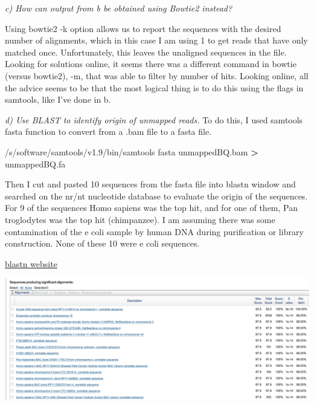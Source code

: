 \documentclass[12pt,]{article}
\newenvironment{Shaded}{\begin{snugshade}}{\end{snugshade}}
\newcommand{\CommentTok}[1]{\textcolor[rgb]{0.56,0.35,0.01}{\textit{#1}}}
\newcommand{\VariableTok}[1]{\textcolor[rgb]{0.00,0.00,0.00}{#1}}
\newcommand{\OperatorTok}[1]{\textcolor[rgb]{0.81,0.36,0.00}{\textbf{#1}}}
\newcommand{\BuiltInTok}[1]{#1}
\newcommand{\ExtensionTok}[1]{#1}
\newcommand{\NormalTok}[1]{#1}
\begin{document}
\emph{c) How can output from b be obtained using Bowtie2 instead?}

Using bowtie2 -k option allows us to report the sequences with the
desired number of alignments, which in this case I am using 1 to get
reads that have only matched once. Unfortunately, this leaves the
unaligned sequences in the file. Looking for solutions online, it seems
there was a different command in bowtie (versus bowtie2), -m, that was
able to filter by number of hits. Looking online, all the advice seems
to be that the most logical thing is to do this using the flags in
samtools, like I've done in b.

\begin{Shaded}
\end{Shaded}

\emph{d) Use BLAST to identify origin of unmapped reads.} To do this, I
used samtools fasta function to convert from a .bam file to a fasta
file.

\begin{Shaded}
\begin{Highlighting}[]
\ExtensionTok{/s/software/samtools/v1.9/bin/samtools}\NormalTok{ fasta unmappedBQ.bam }\OperatorTok{>}\NormalTok{ unmappedBQ.fa}
\end{Highlighting}
\end{Shaded}

Then I cut and pasted 10 sequences from the fasta file into blastn
window and searched on the nr/nt nucleotide database to evaluate the
origin of the sequences. For 9 of the sequences Homo sapiens was the top
hit, and for one of them, Pan troglodytes was the top hit (chimpanzee).
I am assuming there was some contamination of the e coli sample by human
DNA during purification or library construction. None of these 10 were e
coli sequences.

\href{https://blast.ncbi.nlm.nih.gov}{blastn website}

\includegraphics{blast.png}\\
\end{document}
